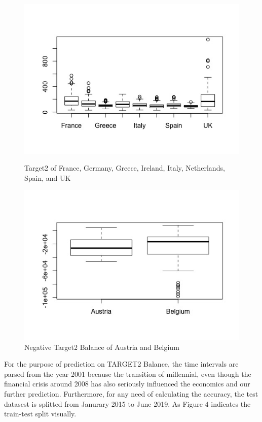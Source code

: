 \documentclass[12pt]{article}
\begin{document}
\begin{figure}[!tbp]
  \centering
  \begin{minipage}[b]{0.5\textwidth}
    \includegraphics[width=\textwidth]{Bal1.jpeg}
    \caption{Target2 of France, Germany, Greece, Ireland, Italy, Netherlands, Spain, and UK}
  \end{minipage}
  \hfill
  \begin{minipage}[b]{0.4\textwidth}
    \includegraphics[width=\textwidth]{Bal2.jpeg}
    \caption{Negative Target2 Balance of Austria and Belgium}
  \end{minipage}
\end{figure}
For the purpose of prediction on TARGET2 Balance, the time intervals are parsed from the year 2001 because the transition of millennial, even though the financial crisis around 2008 has also seriously influenced the economics and our further prediction. Furthermore, for any need of calculating the accuracy, the test datasest is splitted from Janurary 2015 to June 2019. As Figure 4 indicates the train-test split visually. 
\end{document}
